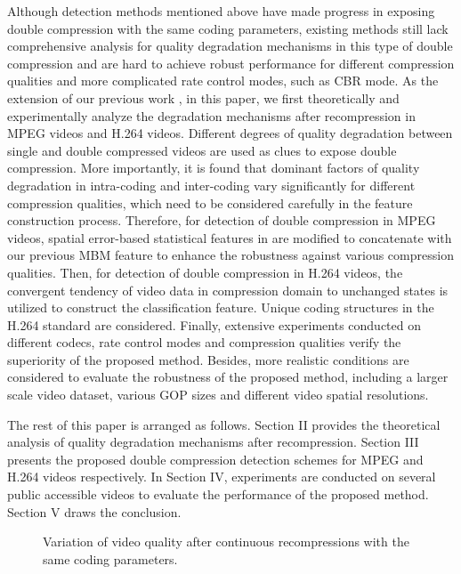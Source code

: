 \documentclass[journal,sort]{IEEEtran}
\begin{document}
Although detection methods mentioned above \cite{huang2014detection,chen2016detecting,zhang2016detecting} have made progress in exposing double compression with the same coding parameters, existing methods still lack comprehensive analysis for quality degradation mechanisms in this type of double compression and are hard to achieve robust performance for different compression qualities and more complicated rate control modes, such as CBR mode. As the extension of our previous work \cite{chen2016detecting}, in this paper, we first theoretically and experimentally analyze the degradation mechanisms after recompression in MPEG videos and H.264 videos. Different degrees of quality degradation between single and double compressed videos are used as clues to expose double compression. More importantly, it is found that dominant factors of quality degradation in intra-coding and inter-coding vary significantly for different compression qualities, which need to be considered carefully in the feature construction process. Therefore, for detection of double compression in MPEG videos, spatial error-based statistical features in \cite{yang2014effective} are modified to concatenate with our previous MBM feature to enhance the robustness against various compression qualities. Then, for detection of double compression in H.264 videos, the convergent tendency of video data in compression domain to unchanged states is utilized to construct the classification feature. Unique coding structures in the H.264 standard are considered. Finally, extensive experiments conducted on different codecs, rate control modes and compression qualities verify the superiority of the proposed method. Besides, more realistic conditions are considered to evaluate the robustness of the proposed method, including a larger scale video dataset, various GOP sizes and different video spatial resolutions.

The rest of this paper is arranged as follows. Section II provides the theoretical analysis of quality degradation mechanisms after recompression. Section III presents the proposed double compression detection schemes for MPEG and H.264 videos respectively. In Section IV, experiments are conducted on several public accessible videos to evaluate the performance of the proposed method. Section V draws the conclusion.
 
\begin{figure}[ht!]
	\centering
	\caption{Variation of video quality after continuous recompressions with the same coding parameters.
	}
	\label{fig:psnr}
\end{figure}
\end{document}
